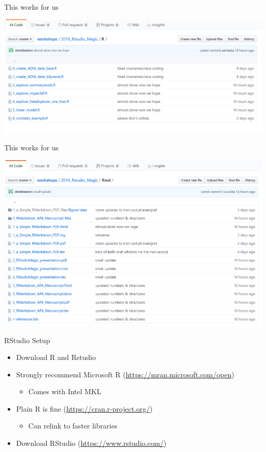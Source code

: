 \documentclass[
  ignorenonframetext,
]{beamer}
\providecommand{\tightlist}{%
  \setlength{\itemsep}{0pt}\setlength{\parskip}{0pt}}
\begin{document}
\begin{frame}{This works for us}
\protect\hypertarget{this-works-for-us-1}{}

\includegraphics{../external/images/Rfolder.PNG}

\end{frame}

\begin{frame}{This works for us}
\protect\hypertarget{this-works-for-us-2}{}

\includegraphics{../external/images/RMDfolder.PNG}

\end{frame}

\begin{frame}{RStudio Setup}
\protect\hypertarget{rstudio-setup-1}{}

\begin{itemize}
\tightlist
\item
  Download R and Rstudio
\item
  Strongly recommend Microsoft R (\url{https://mran.microsoft.com/open})

  \begin{itemize}
  \tightlist
  \item
    Comes with Intel MKL
  \end{itemize}
\item
  Plain R is fine (\url{https://cran.r-project.org/})

  \begin{itemize}
  \tightlist
  \item
    Can relink to faster libraries
  \end{itemize}
\item
  Download RStudio (\url{https://www.rstudio.com/})
\end{itemize}

\end{frame}
\end{document}
